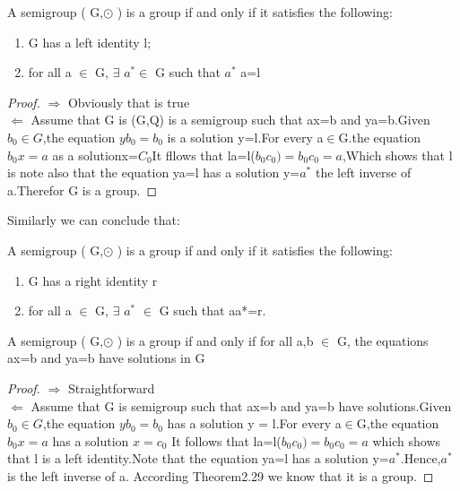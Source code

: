 \documentclass[cn,10pt,math=newtx,citestyle=gb7714-2015,bibstyle=gb7714-2015]{elegantbook}
\begin{document}
\begin{theorem}
    

    A semigroup ( G,$\odot$ )  is a group if and only if it satisfies the following:
    \begin{enumerate}
        \item G has a left identity l;
        \item  for all a $\in$ G, $\exists$ $a^{*}$$ \in$ G such that $a^{*}$ a=l
    \end{enumerate}
\end{theorem}

\begin{proof}
    $\Rightarrow$ Obviously that is true\\
    $\Leftarrow$ Assume that G is (G,Q) is a semigroup such that ax=b and ya=b.Given $b_0\in G$,the equation $yb_0=b_0$ is a solution y=l.For every a$\in$G.the equation $b_0x=a$ as a solutionx=$C_0$It fllows that la=l($b_0c_0)=b_0c_0=a$,Which shows that l is note also that the equation ya=l has a solution y=$a^*$ the left inverse of a.Therefor G is a group.
\end{proof}
Similarly we can conclude that:
\begin{theorem}
    A semigroup ( G,$\odot$ ) is a group if and only if it satisfies the following:
    \begin{enumerate}
        \item G has a right identity r
        \item for all a $\in$ G, $\exists$ $a^{*}$ $\in$ G such that aa*=r.
    \end{enumerate}
\end{theorem}

\begin{theorem}
     A semigroup ( G,$\odot$ )  is a group if and only if for all a,b $\in$ G, the equations ax=b and ya=b have solutions in G
\end{theorem}
\begin{proof}
    $\Rightarrow$ Straightforward\\
    $\Leftarrow$ Assume that G is semigroup such that ax=b and ya=b have solutions.Given $b_0\in G$,the equation $yb_0=b_0$ has a solution y = l.For every a$\in$G,the equation $b_0x=a$ has a solution $x=c_0$ It follows that la=l($b_0c_0)=b_0c_0=a$ which shows that l is a left identity.Note that the equation ya=l has a solution y=$a^*$.Hence,$a^*$is the left inverse of a.
    According Theorem2.29 we know that it is a group.
\end{proof}
\newpage
\end{document}
